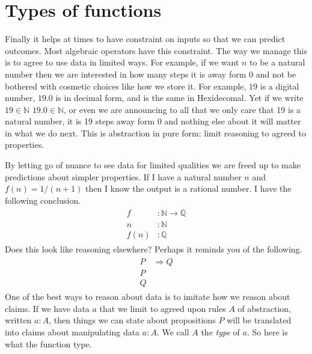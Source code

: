
\section{Types of functions}

Finally it helps at times to have constraint on inputs
so that we can predict outcomes.  Most algebraic operators 
have this constraint. The way we manage this is to agree 
to use data in limited ways.  For example, if we want $n$ 
to be a natural number then we are interested in how many 
steps it is away form $0$ and not be bothered with cosmetic 
choices like how we store it.  For example,  $19$ is a digital
number, $19.0$ is in decimal form, and  is the same 
in Hexidecomal.  Yet if we write $19\in\mathbb{N}$ 
$19.0\in \mathbb{N}$, or even  we are announcing 
to all that we only care that 19 is a natural number, it is 
19 steps away form $0$ and nothing else about it will matter 
in what we do next.  This is abstraction in pure form: limit 
reasoning to agreed to properties.

By letting go of nuance to see data for limited qualities 
we are freed up to make predictions about simpler properties.
If I have a natural number $n$ and $f(n)=1/(n+1)$ then 
I know the output is a rational number.  I have the following 
conclusion.
\begin{gather*}
    \begin{array}{rl}
        f&:\mathbb{N}\to \mathbb{Q}\\
        n&:\mathbb{N}\\
    \hline 
        f(n) &:\mathbb{Q}
    \end{array}
\end{gather*} 
Does this look like reasoning elsewhere?  Perhaps it reminds 
you of the following.
\begin{gather}
    \tag{Modus Ponens}
    \begin{array}{rl}
        P &\Rightarrow Q\\
        P &\\
    \hline 
        Q
    \end{array}
\end{gather} 
One of the best ways to reason about data is to imitate 
how we reason about claims.  If we have data $a$ that we limit 
to agreed upon rules $A$ of abstraction, written $a:A$, 
then things we can state about propositions $P$ will be translated 
into claims about manipulating data $a:A$.  We call 
$A$ the \emph{type} of $a$.  So here is 
what the function type.

